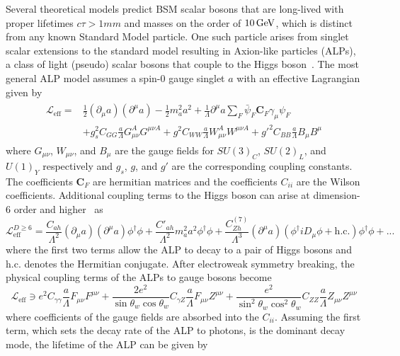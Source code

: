 Several theoretical models predict BSM scalar bosons that are long-lived with proper lifetimes $c\tau>1\unit{mm}$ and masses on the order of $10\,\text{Ge\hspace{-.08em}V}$, which is distinct from any known Standard Model particle. One such particle arises from singlet scalar extensions to the standard model resulting in Axion-like particles (ALPs), a class of light (pseudo) scalar bosons that couple to the Higgs boson~\cite{atlas_alp}. The most general ALP model assumes a spin-0 gauge singlet $a$ with an effective Lagrangian given by~\cite{alp_colliders}
\begin{align}
	\label{eq:alp_lagrangian}
	\begin{split}
		\mathcal{L}_\text{eff}=&\frac{1}{2}\left(\partial_\mu a\right)\left(\partial^\mu a\right)-\frac{1}{2}m_a^2a^2+\frac{1}{\Lambda}\partial^\mu a\sum_{F}\bar{\psi}_F\mathbf{C}_F\gamma_\mu\psi_F\\
		&+g_s^2C_{GG}\frac{a}{\Lambda}G_{\mu\nu}^AG^{\mu\nu A}+g^2C_{WW}\frac{a}{\Lambda}W_{\mu\nu}^AW^{\mu\nu A}+g'^2C_{BB}\frac{a}{\Lambda}B_\mu B^\mu
	\end{split}
\end{align}
where $G_{\mu\nu}$, $W_{\mu\nu}$, and $B_\mu$ are the gauge fields for $SU(3)_C$, $SU(2)_L$, and $U(1)_Y$ respectively and $g_s$, $g$, and $g'$ are the corresponding coupling constants. The coefficients $\mathbf{C}_F$ are hermitian matrices and the coefficients $C_{ii}$ are the Wilson coefficients. Additional coupling terms to the Higgs boson can arise at dimension-6 order and higher~\cite{alp_colliders} as
\begin{equation}
	\label{eq:alp_6d_lagrangian}
	\mathcal{L}_\text{eff}^{D\geq6}=\frac{C_{ah}}{\Lambda^2}(\partial_\mu a)(\partial^\mu a)\phi^\dagger\phi+\frac{C'_{ah}}{\Lambda^2}m_a^2a^2\phi^\dagger\phi+\frac{C_{Zh}^{(7)}}{\Lambda^3}(\partial^\mu a)(\phi^\dagger iD_\mu\phi+\text{h.c.})\phi^\dagger\phi+...
\end{equation}
where the first two terms allow the ALP to decay to a pair of Higgs bosons and h.c. denotes the Hermitian conjugate. After electroweak symmetry breaking, the physical coupling terms of the ALPs to gauge bosons become
\begin{equation}
	\mathcal{L}_\text{eff}\ni e^2C_{\gamma\gamma}\frac{a}{\Lambda}F_{\mu\nu}F^{\mu\nu}+\frac{2e^2}{\sin\theta_w\cos\theta_w}C_{\gamma Z}\frac{a}{\Lambda}F_{\mu\nu}Z^{\mu\nu}+\frac{e^2}{\sin^2\theta_w\cos^2\theta_w}C_{ZZ}\frac{a}{\Lambda}Z_{\mu\nu}Z^{\mu\nu}
\end{equation}
where coefficients of the gauge fields are absorbed into the $C_{ii}$. Assuming the first term, which sets the decay rate of the ALP to photons, is the dominant decay mode, the lifetime of the ALP can be given by~\cite{Draper_2012}

